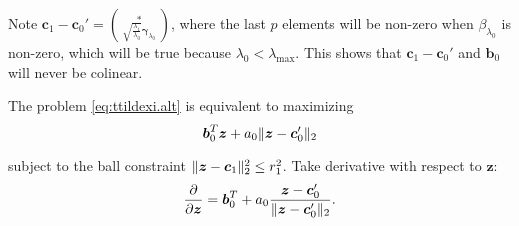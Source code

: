 Note $\boldsymbol c_1-\boldsymbol c_0'=\binom{*}{\sqrt{\frac{\lambda_1}{\lambda_0}}\boldsymbol\gamma_{\lambda_0}}$, where the last $p$ elements will be non-zero when $\beta_{\lambda_0}$ is non-zero, which will be true because $\lambda_0<\lambda_{\max}$. This shows that $\boldsymbol c_1-\boldsymbol c_0'$ and $\boldsymbol b_0$ will never be colinear.

The problem \eqref{eq:ttildexi.alt} is equivalent to maximizing
\begin{equation}
    \label{eq:2.2.1}
    \boldsymbol b_0^T\boldsymbol z+a_0\lVert\boldsymbol z-\boldsymbol c_0'\rVert_2
\end{equation}

subject to the ball constraint $\lVert\boldsymbol z-\boldsymbol c_1\rVert_2^2\leq r_1^2$.
Take derivative with respect to $\boldsymbol z$:
\begin{equation}
    \label{eq:2.2.2}
    \frac{\partial}{\partial\boldsymbol z}=\boldsymbol b_0^T+a_0\frac{\boldsymbol z-\boldsymbol c_0'}{\lVert\boldsymbol z-\boldsymbol c_0'\rVert_2}.
\end{equation}
